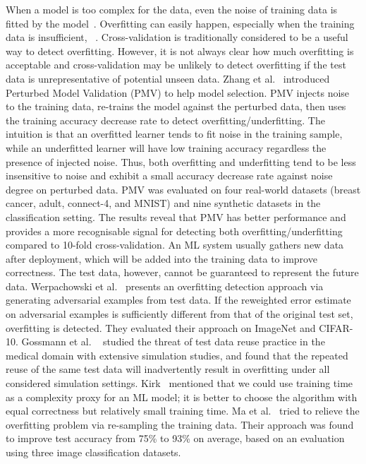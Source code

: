 \label{sec:overfitting} 
When a model is too complex for the data, even the noise of training data is fitted by the model~. 
Overfitting can easily happen, especially when the training data is insufficient, ~.
Cross-validation is traditionally considered to be a useful way to detect overfitting.
However, it is not always clear how much overfitting is acceptable and cross-validation may be unlikely to detect overfitting if the test data is unrepresentative of potential unseen data.
Zhang et al.~ introduced Perturbed Model Validation (PMV) to help model selection. 
PMV injects noise to the training data, re-trains the model against the perturbed data, then uses the training accuracy decrease rate to detect overfitting/underfitting.
The intuition is that an overfitted learner tends to fit noise in the training sample, while an underfitted learner will have low training accuracy regardless the presence of injected noise.
Thus, both overfitting and underfitting tend to be less insensitive to noise and exhibit a small accuracy decrease rate against noise degree on perturbed data.
PMV was evaluated on four real-world datasets (breast cancer, adult, connect-4, and MNIST) and nine synthetic datasets in the classification setting. 
The results reveal that PMV has better performance and provides a more recognisable signal for detecting both overfitting/underfitting compared to 10-fold cross-validation.
An ML system usually gathers new data after deployment, which will be added into the training data to improve correctness. 
The test data, however, cannot be guaranteed to represent the future data.
Werpachowski et al.~ presents an overfitting detection approach via generating adversarial examples from test data.
If the reweighted error estimate on adversarial examples is sufficiently different from that of the original test set, overfitting is detected.
They evaluated their approach on ImageNet and CIFAR-10.
Gossmann et al. ~ studied the threat of test data reuse practice in the medical domain with extensive simulation
studies, and found that the repeated reuse of the same test data will inadvertently result in overfitting under all considered simulation settings.
Kirk~ mentioned that we could use training time as a complexity proxy for an ML model;
it is better to choose the algorithm with equal correctness but relatively small training time.
Ma et al.~ tried to relieve the overfitting problem via re-sampling the training data.
Their approach was found to improve test accuracy from 75\% to 93\% on average, based on an evaluation using three image classification datasets.


